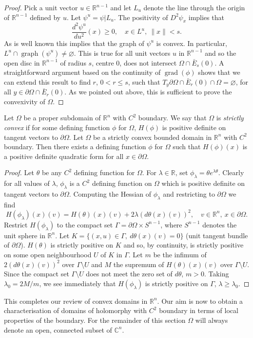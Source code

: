 \begin{proof}
Pick a unit vector $u\in\mathbb R^{n-1}$ and let $L_u$ denote the line through the origin of $\mathbb R^{n-1}$ defined by $u$. Let $\psi^u=\psi|L_u$. The positivity of $D^2\psi_x$ implies that
\[\frac{d^2\psi^u}{du^2}(x)\geq0,\quad x\in L^u,\ \|x\|<s.\]
As is well known this implies that the graph of $\psi^u$ is convex. In particular, $L^u\cap\operatorname{graph}(\psi^u)\neq\varnothing$. This is true for all unit vectors $u$ in $\mathbb R^{n-1}$ and so the open disc in $\mathbb R^{n-1}$ of radius $s$, centre 0, does not intersect $\Omega\cap\bar E_s(0)$. A straightforward argument based on the continuity of $\operatorname{grad}(\phi)$ shows that we can extend this result to find $r$, $0<r\leq s$, such that $T_y\partial\Omega\cap\bar E_r(0)\cap\Omega=\varnothing$, for all $y\in\partial\Omega\cap\bar E_r(0)$. As we pointed out above, this is sufficient to prove the convexivity of $\Omega$.
\end{proof}
 Let $\Omega$ be a proper subdomain of $\mathbb R^n$ with $C^2$ boundary. We say that $\Omega$ is \emph{strictly convex} if for some defining function $\phi$ for $\Omega$, $H(\phi)$ is positive definite on tangent vectors to $\partial\Omega$.
 Let $\Omega$ be a strictly convex bounded domain in $\mathbb R^n$ with $C^2$ boundary. Then there exists a defining function $\phi$ for $\Omega$ such that $H(\phi)(x)$ is a positive definite quadratic form for all $x\in\partial\Omega$.
\begin{proof}
Let $\theta$ be any $C^2$ defining function for $\Omega$. For $\lambda\in\mathbb R$, set $\phi_\lambda=\theta e^{\lambda\theta}$. Clearly for all values of $\lambda$, $\phi_\lambda$ is a $C^2$ defining function on $\Omega$ which is positive definite on tangent vectors to $\partial\Omega$. Computing the Hessian of $\phi_\lambda$ and restricting to $\partial\Omega$ we find
\[H(\phi_\lambda)(x)(v)=H(\theta)(x)(v)+2\lambda(d\theta(x)(v))^2,\quad v\in\mathbb R^n,\ x\in\partial\Omega.\]
Restrict $H(\phi_\lambda)$ to the compact set $\Gamma=\partial\Omega\times S^{n-1}$, where $S^{n-1}$ denotes the unit sphere in $\mathbb R^n$. Let $K=\{(x,u)\in\Gamma,\ d\theta(x)(v)=0\}$ (unit tangent bundle of $\partial\Omega$). $H(\theta)$ is strictly positive on $K$ and so, by continuity, is strictly positive on some open neighbourhood $U$ of $K$ in $\Gamma$. Let $m$ be the infimum of $2(d\theta(x)(v))^2$ over $\Gamma\setminus U$ and $M$ the supremum of $H(\theta)(x)(v)$ over $\Gamma\setminus U$. Since the compact set $\Gamma\setminus U$ does not meet the zero set of $d\theta$, $m>0$. Taking $\lambda_0=2M/m$, we see immediately that $H(\phi_\lambda)$ is strictly positive on $\Gamma$, $\lambda\geq\lambda_0$.
\end{proof}
This completes our review of convex domains in $\mathbb R^n$. Our aim is now to obtain a characterisation of domains of holomorphy with $C^2$ boundary in terms of local properties of the boundary. For the remainder of this section $\Omega$ will always denote an open, connected subset of $\mathbb C^n$.

